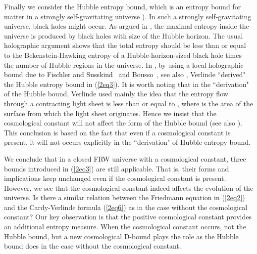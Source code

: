 \documentclass[a4paper,12pt]{article}
\begin{document}
 Finally we consider the Hubble entropy bound, which is an entropy
 bound for matter in a strongly self-gravitating universe \coordHE{}). In such
 a strongly self-gravitating universe,  black holes might occur. 
 As argued in \cite{FS,Hubb}, the maximal
 entropy inside the universe is produced by black holes with
 size of the Hubble horizon. The usual holographic argument shows
 that the total entropy should be less than or equal to the
 Bekenstein-Hawking entropy of a Hubble-horizon-sized black hole
 times the number of Hubble regions in the universe. In
 \cite{Verl}, by using a local holographic bound due to
 Fischler and Susskind~\cite{FS} and Bousso~\cite{Bous}, see
 also \cite{Wald}, Verlinde ``derived" the Hubble entropy bound
 in (\ref{2eq3}). It is worth noting that in the ``derivation" of the Hubble 
bound, Verlinde used mainly the idea that the entropy flow \coordHE{} through 
a contracting light sheet is less than or equal to \coordHE{}, where \coordHE{} is the 
area of the surface from which the light sheet originates.
Hence we insist that the cosmological constant will not affect the form of 
the Hubble bound (see also \cite{CM}). This conclusion is based on the fact that
even if a cosmological constant is present, it will not 
occurs explicitly in the ``derivation" of Hubble entropy bound.  



We conclude that in a closed FRW universe with a cosmological
constant, three bounds introduced in (\ref{2eq3}) are still 
applicable.  That is, their forms and implications keep 
unchanged even if  the cosmological constant is present. 
However, we see that the cosmological constant indeed affects the
evolution of the universe. Is there a similar relation between the
Friedmann equation in (\ref{2eq2}) and the Cardy-Verlinde formula
(\ref{2eq6}) as in the case without the cosmological constant?  
 Our key observation is that the positive  cosmological constant provides an
additional entropy measure. When the cosmological constant
occurs, not the Hubble bound, but a new cosmological D-bound
plays the role as the Hubble bound does in the case without the
cosmological constant.
\end{document}
